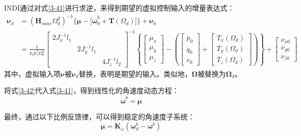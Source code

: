 INDI通过对式\eqref{3-41}进行求逆，来得到期望的虚拟控制输入的增量表达式：
\begin{equation}
    \begin{aligned}
        \boldsymbol{\nu}_d&=(\boldsymbol{H}_{vane}\Omega_0^2)^{-1}\Big\{\boldsymbol{\mu} -\big[\boldsymbol{\dot{\omega}}_0^b+\boldsymbol{T}(\Omega_d)\big]\Big\}+\boldsymbol{\nu}_0\\
        &=\frac{1}{k_{\delta}k_f^2\Omega_0^2}
        \left[\begin{array}{ccc}2J_x^{-1}l_1 & & \\& 2J_y^{-1}l_1 & \\& & 4J_z^{-1}l_2\end{array}\right]^{-1}
        \left\{\begin{bmatrix}\mu_{x} \\ \mu_{y} \\ \mu_{z}\end{bmatrix}
        -\left (\begin{bmatrix}\dot{p}_0 \\ \dot{q}_0 \\ \dot{r}_0 \end{bmatrix}+\begin{bmatrix}T_{x}(\Omega_d) \\ T_{y}(\Omega_d) \\ T_{z}(\Omega_d)
        \end{bmatrix}\right )\right\}
        +  \begin{bmatrix}\nu_{x0} \\ \nu_{y0} \\ \nu_{z0}\end{bmatrix}
    \end{aligned}
    \label{3-42}
\end{equation}
其中，虚拟输入项$\boldsymbol{\nu}$被$\boldsymbol{\nu}_d$替换，表明是期望的输入。类似地，$\boldsymbol{\Omega}$被替换为$\boldsymbol{\Omega}_d$。

将式\eqref{3-42}代入式\eqref{3-41}，得到线性化的角速度动态方程：
\begin{equation}
    \dot{\boldsymbol \omega}^b=\boldsymbol{\mu}
    \label{3-43}
\end{equation}

最终，通过以下比例反馈律，可以得到稳定的角速度子系统：
\begin{equation}
    \boldsymbol{\mu}=\boldsymbol{K}_{\omega}(\boldsymbol{\omega}_d^b-\boldsymbol{\omega}^b)
    \label{3-44}
\end{equation}


